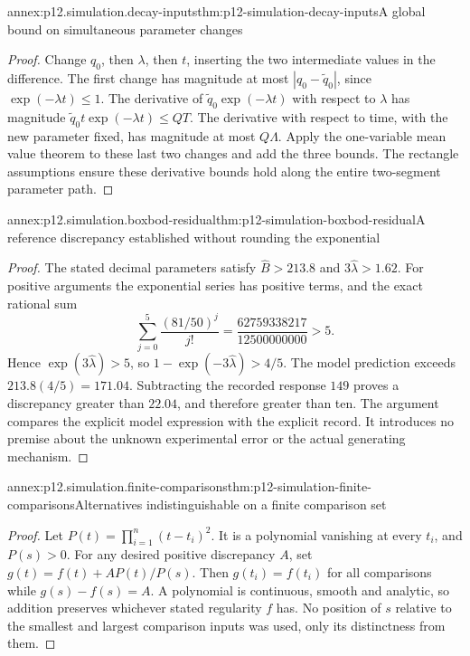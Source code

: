 \begin{annexitem}{annex:p12.simulation.decay-inputs}{thm:p12-simulation-decay-inputs}{A global bound on simultaneous parameter changes}
\begin{proof}
Change \(q_0\), then \(\lambda\), then \(t\), inserting the
two intermediate values in the difference. The first change has
magnitude at most \(|q_0-\widetilde q_0|\), since
\(\exp(-\lambda t)\leq1\). The derivative of
\(\widetilde q_0\exp(-\lambda t)\) with respect to
\(\lambda\) has magnitude
\(\widetilde q_0t\exp(-\lambda t)\leq QT\).
The derivative with respect to time, with the new parameter fixed,
has magnitude at most \(Q\Lambda\). Apply the one-variable
mean value theorem to these last two changes and add the three
bounds. The rectangle assumptions ensure these derivative bounds
hold along the entire two-segment parameter path.
\end{proof}
\end{annexitem}

\begin{annexitem}{annex:p12.simulation.boxbod-residual}{thm:p12-simulation-boxbod-residual}{A reference discrepancy established without rounding the exponential}
\begin{proof}
The stated decimal parameters satisfy \(\widehat B>213.8\)
and \(3\widehat\lambda>1.62\). For positive arguments the
exponential series has positive terms, and the exact rational sum
\[
 \sum_{j=0}^5\frac{(81/50)^j}{j!}
 =\frac{62759338217}{12500000000}>5.
\]
Hence \(\exp(3\widehat\lambda)>5\), so
\(1-\exp(-3\widehat\lambda)>4/5\).
The model prediction exceeds \(213.8(4/5)=171.04\).
Subtracting the recorded response \(149\) proves a discrepancy
greater than \(22.04\), and therefore greater than ten.
The argument compares the explicit model expression with the
explicit record. It introduces no premise about the unknown
experimental error or the actual generating mechanism.
\end{proof}
\end{annexitem}

\begin{annexitem}{annex:p12.simulation.finite-comparisons}{thm:p12-simulation-finite-comparisons}{Alternatives indistinguishable on a finite comparison set}
\begin{proof}
Let \(P(t)=\prod_{i=1}^n(t-t_i)^2\). It is a polynomial
vanishing at every \(t_i\), and \(P(s)>0\).
For any desired positive discrepancy \(A\), set
\(g(t)=f(t)+A P(t)/P(s)\).
Then \(g(t_i)=f(t_i)\) for all comparisons while
\(g(s)-f(s)=A\). A polynomial is continuous, smooth and analytic,
so addition preserves whichever stated regularity \(f\) has.
No position of \(s\) relative to the smallest and largest
comparison inputs was used, only its distinctness from them.
\end{proof}
\end{annexitem}

